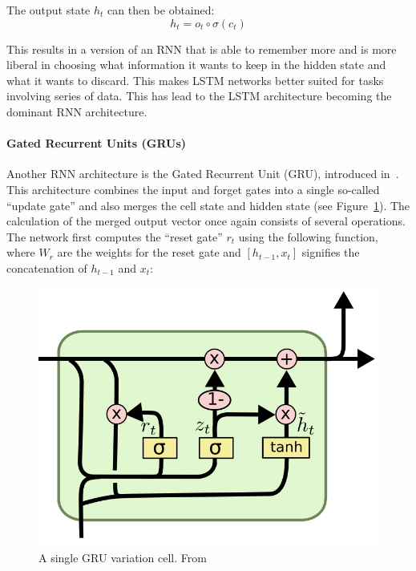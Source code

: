             The output state \(h_t\) can then be obtained:
            \begin{equation} \label{eq:hidden_output_gate_lstm}
                h_t = o_t \circ \sigma(c_t)
            \end{equation}

            This results in a version of an RNN that is able to remember more and is more liberal in choosing what information it wants to keep in the hidden state and what it wants to discard. 
            This makes LSTM networks better suited for tasks involving series of data. 
            This has lead to the LSTM architecture becoming the dominant RNN architecture. 

            \paragraph{Gated Recurrent Units (GRUs)} Another RNN architecture is the Gated Recurrent Unit (GRU), introduced in~\cite{cho2014learning}. 
            This architecture combines the input and forget gates into a single so-called ``update gate'' and also merges the cell state and hidden state (see Figure~\ref{fig:gru_cell}). 
            The calculation of the merged output vector once again consists of several operations. The network first computes the ``reset gate'' \(r_t\) using the following function, where \(W_r\) are the weights for the reset gate and \([h_{t-1}, x_t]\) signifies the concatenation of \(h_{t-1}\) and \(x_t\):

            \begin{figure}[h!]
                \begin{center}
                    \includegraphics[scale=0.5]{figures/gru_cell.png}
                \end{center}
                \caption{A single GRU variation cell. From~\cite{olah2015understanding}\label{fig:gru_cell}}
            \end{figure}

